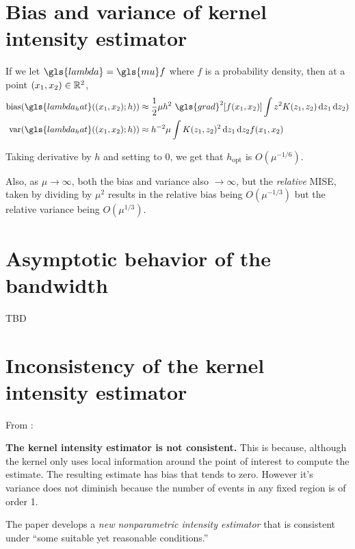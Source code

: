 \section{Bias and variance of kernel intensity estimator}
\label{sec:theory:bias_variance}

If we let \(\gls{lambda} = \gls{mu} f\) where \(f\) is a probability density, then at a point \((x_1, x_2) \in \mathbb{R}^2\),
\begin{align}
    \mbox{bias}(\gls{lambda_hat}((x_1, x_2);h)) & \approx
        \frac{1}{2} \mu h^2 ~ \gls{grad}^2\!\left[ f(x_1, x_2) \right]
            \int { z^2 K(z_1, z_2) \diff{z_1} \diff{z_2)} } \\
    \mbox{var}(\gls{lambda_hat}((x_1, x_2);h)) & \approx
        h^{-2} \mu
            \int { K(z_1, z_2)^2\diff{z_1} \diff{z_2} } f(x_1, x_2)
\end{align}

Taking derivative by \(h\) and setting to \(0\), we get that \(h_{\mbox{opt}}\) is \(O(\mu^{-1/6})\).

Also, as \(\mu \to \infty\), both the bias and variance also \(\to \infty\),
but the \textit{relative} MISE, taken by dividing by \(\mu^2\) results in the relative bias being \(O(\mu^{-1/3})\)
but the relative variance being \(O(\mu^{1/3})\).

\section{Asymptotic behavior of the bandwidth}
\label{sec:theory:bandwidth}

TBD

\section{Inconsistency of the kernel intensity estimator}
\label{sec:theory:inconsistency}

From \citet{guan2008consistent}:

{
\color{red}
\textbf{The kernel intensity estimator is not consistent.}
This is because, although the kernel only uses local information around the point of interest to compute the estimate.
The resulting estimate has bias that tends to zero.
However it's variance does not diminish because the number of events in any fixed region is of order 1.
}

The paper develops a \textit{new nonparametric intensity estimator} that is consistent under ``some suitable yet reasonable conditions.''


